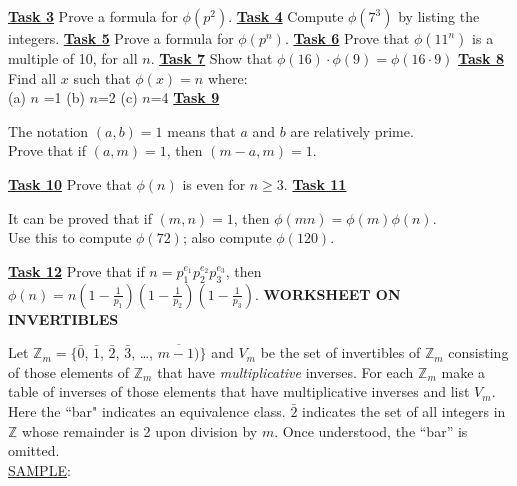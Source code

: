 \documentclass[12pt, fleqn, twoside]{book}
\makeatletter
\def\cleardoublepage{\clearpage\if@twoside \ifodd\c@page\else
   \hbox{}\thispagestyle{empty}\newpage\if@twocolumn\hbox{}\newpage\fi\fi\fi}
\makeatother
\begin{document}
\underline{\bf{Task 3}} Prove a formula for $\phi(p^2)$.\vfill
\underline{\bf{Task 4}} Compute $\phi(7^3)$ by listing the integers.\vfill
\underline{\bf{Task 5}} Prove a formula for $\phi(p^n)$.\vfill
\underline{\bf{Task 6}} Prove that $\phi(11^n)$ is a multiple of 10, for all $n$.\vfill
\underline{\bf{Task 7}} Show that $\phi(16)\cdot\phi(9) =  \phi(16\cdot 9)$\vfill
\cleardoublepage
\underline{\bf{Task 8}} Find all $x$ such that $\phi(x)=n$ where:\\[.1in]
(a) $n$ =1 \hfill (b) $n$=2 \hfill (c) $n$=4 \hspace{2in} \vfill
\underline{\bf{Task 9}} \begin{minipage}[t]{6in}The notation $(a,b)=1$ means that $a$ and $b$ are relatively prime.\\
Prove that if $(a,m)=1$, then $(m-a,m)=1$.\end{minipage}\vfill
\underline{\bf{Task 10}} Prove that $\phi(n)$ is even for $n\geq 3$.\vfill
\underline{\bf{Task 11}} \begin{minipage}[t]{6in}It can be proved that if $(m,n)=1$, then $\phi(mn)=\phi(m)\phi(n)$.\\
Use this to compute $\phi(72)$; also compute $\phi(120)$.\end{minipage}\vfill
\underline{\bf{Task 12}} Prove that if $n=p_1^{e_1}p_2^{e_2}p_3^{e_3}$, then $\phi(n)=n\left(1-\frac{1}{p_1}\right)\left(1-\frac{1}{p_2}\right)\left(1-\frac{1}{p_3}\right)$.\vfill
%
%
%
\cleardoublepage
%
%
%
{\large \bf WORKSHEET ON INVERTIBLES}\\[.25in]
Let $\mathbb{Z}_m=\{\bar{0}$, $\bar{1}$, $\bar{2}$, $\bar{3}$, \dots, $\overline{m-1)}\}$ and $V_m$ be the set of invertibles of $\mathbb{Z}_m$ consisting of those elements of $\mathbb{Z}_m$ that have \textit{multiplicative} inverses.  For each $\mathbb{Z}_m$ make a table of inverses of those elements that have multiplicative inverses and list $V_m$.  Here the ``bar" indicates an equivalence class.  $\bar{2}$ indicates the set of all integers in $\mathbb{Z}$ whose remainder is 2 upon division by $m$.  Once understood, the ``bar'' is omitted.\\[.25in]
\underline{SAMPLE}:\\
\end{document}
